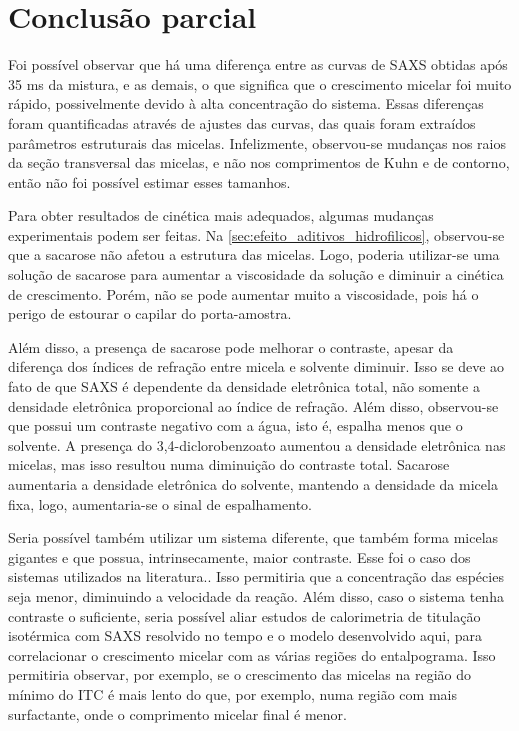 	\FloatBarrier
	
	\section{Conclusão parcial}  
	
	Foi possível observar que há uma diferença entre as curvas de SAXS obtidas após 35 ms da mistura, e as demais, o que significa que o crescimento micelar foi muito rápido, possivelmente devido à alta concentração do sistema. Essas diferenças foram quantificadas através de ajustes das curvas, das quais foram extraídos parâmetros estruturais das micelas. Infelizmente, observou-se mudanças nos raios da seção transversal das micelas, e não nos comprimentos de Kuhn e de contorno, então não foi possível estimar esses tamanhos.
	
	Para obter resultados de cinética mais adequados, algumas mudanças experimentais podem ser feitas. Na \autoref{sec:efeito_aditivos_hidrofilicos}, observou-se que a sacarose não afetou a estrutura das micelas. Logo, poderia utilizar-se uma solução de sacarose para aumentar a viscosidade da solução e diminuir a cinética de crescimento. Porém, não se pode aumentar muito a viscosidade, pois há o perigo de estourar o capilar do porta-amostra.
	
	Além disso, a presença de sacarose pode melhorar o contraste, apesar da diferença dos índices de refração entre micela e solvente diminuir. Isso se deve ao fato de que SAXS é dependente da densidade eletrônica total, não somente a densidade eletrônica proporcional ao índice de refração. Além disso, observou-se que \TTAB{} possui um contraste negativo com a água, isto é, espalha menos que o solvente. A presença do 3,4-diclorobenzoato aumentou a densidade eletrônica nas micelas, mas isso resultou numa diminuição do contraste total. %
	Sacarose aumentaria a densidade eletrônica do solvente, mantendo a densidade da micela fixa, logo, aumentaria-se o sinal de espalhamento.
	
	Seria possível também utilizar um sistema diferente, que também forma micelas gigantes e que possua, intrinsecamente, maior contraste. Esse foi o caso dos sistemas utilizados na literatura.\cite{Jensen2014a, Jensen2013a, Jensen2016a}.	Isso permitiria que a concentração das espécies seja menor, diminuindo a velocidade da reação. Além disso, caso o sistema tenha contraste o suficiente, seria possível aliar estudos de calorimetria de titulação isotérmica com SAXS resolvido no tempo e o modelo desenvolvido aqui, para correlacionar o crescimento micelar com as várias regiões do entalpograma. Isso permitiria observar, por exemplo, se o crescimento das micelas na região do mínimo do ITC é mais lento do que, por exemplo, numa região com mais surfactante, onde o comprimento micelar final é menor.
	
